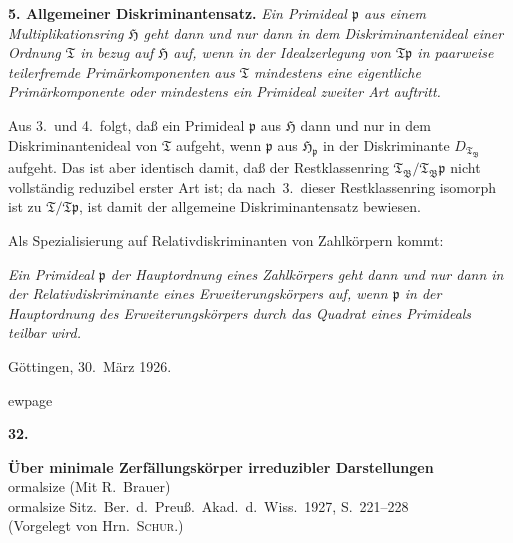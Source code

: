 \documentclass[12pt,a4paper]{article}
\newcommand{\idealp}{\mathfrak{p}}
\newcommand{\HH}{\mathfrak{H}}          %
\newcommand{\TT}{\mathfrak{T}}          %
\theoremstyle{definition}
\begin{document}
\medskip


\noindent\textbf{5. Allgemeiner Diskriminantensatz.} \textit{Ein Primideal
$\idealp$ aus einem Multiplikationsring $\HH$ geht dann und nur dann in
dem Diskriminantenideal einer Ordnung $\TT$ in bezug auf $\HH$ auf, wenn
in der Idealzerlegung von $\TT\idealp$ in paarweise teilerfremde
Prim\"arkomponenten aus $\TT$ mindestens eine eigentliche
Prim\"arkomponente oder mindestens ein Primideal zweiter Art
auftritt.}

Aus 3.\ und 4.\ folgt, da\ss{} ein Primideal $\idealp$ aus $\HH$ dann und nur
in dem Diskriminantenideal von $\TT$ aufgeht, wenn $\idealp$ aus
$\HH_{\idealp}$ in der Diskriminante $D_{\TT_{\mathfrak{B}}}$ aufgeht.
Das ist aber identisch damit, da\ss{} der Restklassenring
$\TT_{\mathfrak{B}}/\TT_{\mathfrak{B}}\idealp$ nicht vollst\"andig reduzibel
erster Art ist; da nach~3.\ dieser Restklassenring isomorph ist zu
$\TT/\TT\idealp$, ist damit der allgemeine Diskriminantensatz bewiesen.

Als Spezialisierung auf Relativdiskriminanten von Zahlk\"orpern kommt:

\textit{Ein Primideal $\idealp$ der Hauptordnung eines Zahlk\"orpers geht dann
und nur dann in der Relativdiskriminante eines Erweiterungsk\"orpers auf,
 wenn $\idealp$ in der Hauptordnung des Erweiterungsk\"orpers durch das
Quadrat eines Primideals teilbar wird.}

\begin{flushright}
G\"ottingen, 30.\ M\"arz 1926.
\end{flushright}



ewpage
\setcounter{page}{566}


\begin{center}
{\Large\bfseries 32.}
\medskip

{\Large\bfseries \"Uber minimale Zerf\"allungsk\"orper irreduzibler
Darstellungen}\\[0.5em]
{ ormalsize (Mit R.\ Brauer)}\\[0.3em]
{ ormalsize Sitz.\ Ber.\ d.\ Preu\ss.\ Akad.\ d.\ Wiss.\ 1927, S.\ 221--228}\\[0.3em]
{\small (Vorgelegt von Hrn.\ \textsc{Schur}.)}
\end{center}
\end{document}
